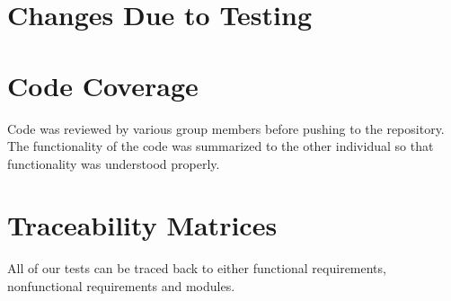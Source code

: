 \documentclass[12pt, titlepage]{article}
\begin{document}
\section{Changes Due to Testing}


\section{Code Coverage}

Code was reviewed by various group members before pushing to the repository. The functionality of the code was summarized to the other individual so that functionality was understood properly.

\section{Traceability Matrices}
All of our tests can be traced back to either functional requirements, nonfunctional requirements and modules.
\end{document}

